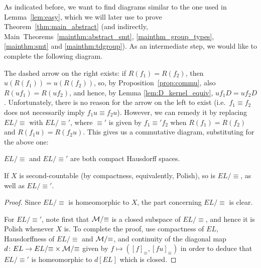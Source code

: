 	As indicated before, we want to find diagrams similar to the one used in Lemma~\ref{lem:easy}, which we will later use to prove Theorem~\ref{thm:main_abstract} (and indirectly, Main~Theorems~\ref{mainthm:abstract_smt}, \ref{mainthm_group_types}, \ref{mainthm:smt} and \ref{mainthm:tdgroup}). As an intermediate step, we would like to complete the following diagram.
	
	\begin{center}
	\end{center}
	The dashed arrow on the right exists: if $R(f_1)=R(f_2)$, then $u(R(f_1))=u(R(f_2))$, so, by Proposition~\ref{prop:commu}, also $R(uf_1)=R(uf_2)$, and hence, by Lemma \ref{lem:D_kernel_equiv}, $uf_1D = uf_2D$. Unfortunately, there is no reason for the arrow on the left to exist (i.e.\ $f_1\equiv f_2$ does not necessarily imply $f_1u\equiv f_2u$). However, we can remedy it by replacing $EL/{\equiv}$ with $EL/{\equiv'}$, where $\equiv'$ is given by $f_1\equiv' f_2$ when $R(f_1)=R(f_2)$ and $R(f_1u)=R(f_2u)$. This gives us a commutative diagram, substituting for the above one:
	\begin{center}
	\end{center}
	
	\begin{prop}\label{prop: quotients of EL are Polish}
		$EL/{\equiv}$ and $EL/{\equiv'}$ are both compact Hausdorff spaces.
		
		If $X$ is second-countable (by compactness, equivalently, Polish), so is $EL/{\equiv}$, as well as $EL/{\equiv'}$.
	\end{prop}
	\begin{proof}
		Since $EL/{\equiv}$ is homeomorphic to $X$, the part concerning $EL/{\equiv}$ is clear.
		
		For $EL/{\equiv'}$, note first that ${\mathcal M}/{\equiv}$ is a closed subspace of $EL/{\equiv}$, and hence it is Polish whenever $X$ is. To complete the proof, use compactness of $EL$, Hausdorffness of $EL/{\equiv}$ and ${\mathcal M}/{\equiv}$, and continuity of the diagonal map $d \colon EL\to EL/{\equiv}\times {\mathcal M}/{\equiv}$ given by $f\mapsto ([f]_\equiv,[fu]_\equiv)$ in order to deduce that $EL/{\equiv'}$ is homeomorphic to $d[EL]$ which is closed.
	\end{proof}
	
